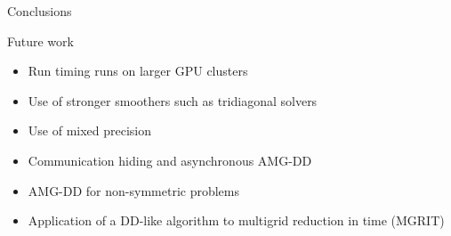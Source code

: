 \documentclass[18pt,xcolor=table]{beamer}
\begin{document}
\begin{frame}{Conclusions}
\begin{block}{Future work}
\begin{itemize}
\item Run timing runs on larger GPU clusters
\item Use of stronger smoothers such as tridiagonal solvers
\item Use of mixed precision
\item Communication hiding and asynchronous AMG-DD
\item AMG-DD for non-symmetric problems
\item Application of a DD-like algorithm to multigrid reduction in time (MGRIT)
\end{itemize}
\end{block}

\end{frame}


\end{document}
